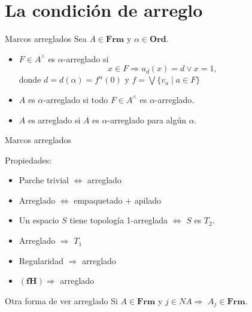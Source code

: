 \documentclass[compress,12pt]{beamer}
\begin{document}
\section{La condición de arreglo}
\begin{frame}{Marcos arreglados}
    Sea $A\in \mathbf{Frm}$ y $\alpha\in \mathbf{Ord}$. 
    \begin{itemize}
        \item $F\in A^\wedge$ es $\alpha$-arreglado si 
    \[
    x\in F\Rightarrow u_d(x)=d\vee x=1,
    \]
    donde $d=d(\alpha)=f^\alpha(0)$ y $f=\bigvee\{v_a\mid a\in F\}$
    \item $A$ es $\alpha$-arreglado si todo $F\in A^\wedge$ es $\alpha$-arreglado.
    \item $A$ es arreglado si $A$ es $\alpha$-arreglado para algún $\alpha$.
    \end{itemize}
\end{frame}

\begin{frame}{Marcos arreglados}
    \begin{block}{Propiedades:}
        \begin{itemize}
            \item Parche trivial $\Leftrightarrow$ arreglado
            \item Arreglado $\Leftrightarrow $ empaquetado $+$ apilado
            \item Un espacio $S$ tiene topología 1-arreglada $\Leftrightarrow$ $S$ es $T_2$.
            \item Arreglado $\Rightarrow$ $T_1$
            \item Regularidad $\Rightarrow$ arreglado
            \item $(\mathbf{fH})\Rightarrow$ arreglado
        \end{itemize}
    \end{block}
\end{frame}

\begin{frame}{Otra forma de ver arreglado}
    Si $A\in \mathbf{Frm}$ y $j\in NA\Rightarrow$ $A_j\in \mathbf{Frm}$.
    
    \end{frame}
    
\end{document}
